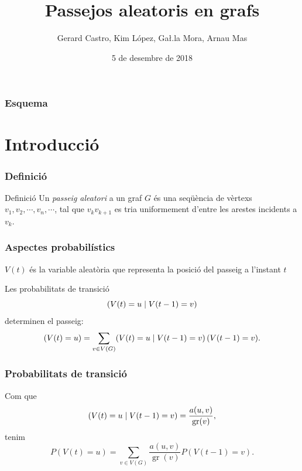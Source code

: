 \documentclass[aspectratio=169, 12pt]{beamer}
\title{Passejos aleatoris en grafs}
\author{Gerard Castro, Kim López, Ga\l.la Mora, Arnau Mas}
\date{5 de desembre de 2018}
\let\P\relax
\DeclareMathOperator{\P}{P}
\DeclareMathOperator{\gr}{gr}
\begin{document}
\begin{frame}[plain]
	\titlepage
\end{frame}


\begin{frame}
	\frametitle{Esquema}
	\centering
	\tableofcontents

\end{frame}

\section{Introducció}

\begin{frame}
	\frametitle{Definició}
	\begin{block}{Definició}
		Un \emph{passeig aleatori} a un graf \( G \) és una seqüència de vèrtexs \( v_1, v_2, \cdots, v_n, \cdots \), tal que \( v_kv_{k+1} \) es tria uniformement d'entre les arestes incidents a \( v_k \).
	\end{block}
\end{frame}

\begin{frame}
	\frametitle{Aspectes probabilístics}
	\( V(t) \) és la variable aleatòria que representa la posició del passeig a l'instant \( t \) \pause

	Les probabilitats de transició \[ \P(V(t) = u \mid V(t - 1) = v) \] determinen el passeig: \pause
	\begin{equation*}
		\P(V(t) = u) = \sum_{v \in V(G)} \P(V(t) = u \mid V(t - 1) = v) \, \P(V(t - 1) = v).
	\end{equation*}
\end{frame}

\begin{frame}
	\frametitle{Probabilitats de transició}
	Com que \[ \P(V(t) = u \mid V(t - 1) = v) = \frac{a(u,v)}{\gr(v)}, \] \pause
	tenim
	\[ P(V(t) = u) = \sum_{v \in V(G)} \frac{a(u,v)}{\gr(v)}P(V(t - 1) = v). \]
\end{frame}
\end{document}
